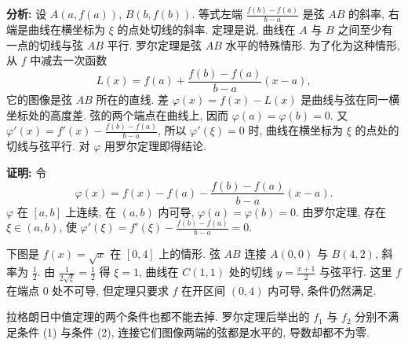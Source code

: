 \documentclass[UTF8,openany]{ctexbook}
\theoremstyle{chinesetextbook}
\newenvironment{cnproof}{\par\indent\textbf{证明:} \ignorespaces}{\par}
\begin{document}
\par\indent\textbf{分析:} 设 $A(a,f(a))$, $B(b,f(b))$. 等式左端 $\displaystyle\frac{f(b)-f(a)}{b-a}$ 是弦 $AB$ 的斜率, 右端是曲线在横坐标为 $\xi$ 的点处切线的斜率. 定理是说, 曲线在 $A$ 与 $B$ 之间至少有一点的切线与弦 $AB$ 平行. 罗尔定理是弦 $AB$ 水平的特殊情形. 为了化为这种情形, 从 $f$ 中减去一次函数
\[
L(x)=f(a)+\frac{f(b)-f(a)}{b-a}(x-a),
\]
它的图像是弦 $AB$ 所在的直线. 差 $\varphi(x)=f(x)-L(x)$ 是曲线与弦在同一横坐标处的高度差. 弦的两个端点在曲线上, 因而 $\varphi(a)=\varphi(b)=0$. 又 $\displaystyle\varphi'(x)=f'(x)-\frac{f(b)-f(a)}{b-a}$, 所以 $\varphi'(\xi)=0$ 时, 曲线在横坐标为 $\xi$ 的点处的切线与弦平行. 对 $\varphi$ 用罗尔定理即得结论.
\begin{cnproof}
令
\[
\varphi(x)=f(x)-f(a)-\frac{f(b)-f(a)}{b-a}(x-a).
\]
$\varphi$ 在 $[a,b]$ 上连续, 在 $(a,b)$ 内可导, $\varphi(a)=\varphi(b)=0$. 由罗尔定理, 存在 $\xi\in(a,b)$, 使 $\displaystyle\varphi'(\xi)=f'(\xi)-\frac{f(b)-f(a)}{b-a}=0$.
\end{cnproof}
下图是 $f(x)=\sqrt x$ 在 $[0,4]$ 上的情形. 弦 $AB$ 连接 $A(0,0)$ 与 $B(4,2)$, 斜率为 $\displaystyle\frac12$. 由 $\displaystyle\frac1{2\sqrt\xi}=\frac12$ 得 $\xi=1$, 曲线在 $C(1,1)$ 处的切线 $\displaystyle y=\frac{x+1}2$ 与弦平行. 这里 $f$ 在端点 $0$ 处不可导, 但定理只要求 $f$ 在开区间 $(0,4)$ 内可导, 条件仍然满足.
\begin{center}
\end{center}

拉格朗日中值定理的两个条件也都不能去掉. 罗尔定理后举出的 $f_1$ 与 $f_2$ 分别不满足条件 (1) 与条件 (2), 连接它们图像两端的弦都是水平的, 导数却都不为零.
\end{document}
